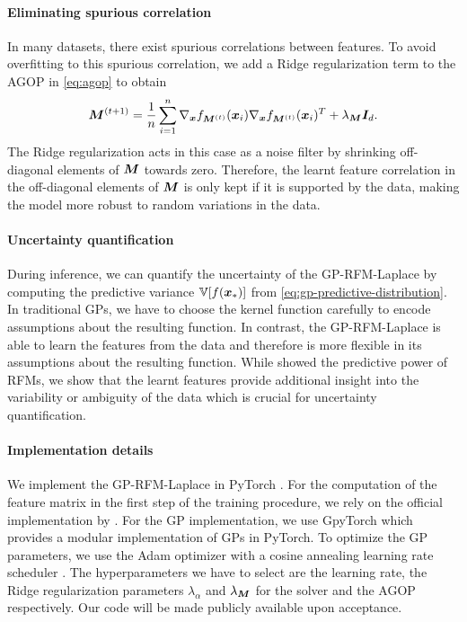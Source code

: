 \paragraph{Eliminating spurious correlation}
In many datasets, there exist spurious correlations between features. To avoid overfitting to this spurious correlation, we add a Ridge regularization term to the AGOP in \cref{eq:agop} to obtain
\begin{align}
    {\bm{M}}^{(t+1)} = \frac{1}{n}\sum_{i=1}^n \nabla_{{\bm{x}}}f_{{\bm{M}}^{(t)}}({\bm{x}}_i)\nabla_{{\bm{x}}}f_{{\bm{M}}^{(t)}}({\bm{x}}_i)^T + \lambda_{\bm{M}}{\bm{I}}_d.
    \label{eq:agop-ridge}
\end{align}
The Ridge regularization acts in this case as a noise filter by shrinking off-diagonal elements of ${\bm{M}}$ towards zero.
Therefore, the learnt feature correlation in the off-diagonal elements of ${\bm{M}}$ is only kept if it is supported by the data, making the model more robust to random variations in the data.

\paragraph{Uncertainty quantification}
During inference, we can quantify the uncertainty of the GP-RFM-Laplace by computing the predictive variance $\mathbb{V}[f({\bm{x}}_\ast)]$ from \cref{eq:gp-predictive-distribution}.
In traditional GPs, we have to choose the kernel function carefully to encode assumptions about the resulting function.
In contrast, the GP-RFM-Laplace is able to learn the features from the data and therefore is more flexible in its assumptions about the resulting function.
While \citet{radhakrishnan2022feature} showed the predictive power of RFMs, we show that the learnt features provide additional insight into the variability or ambiguity of the data which is crucial for uncertainty quantification.

\paragraph{Implementation details}
We implement the GP-RFM-Laplace in PyTorch \citep{paszke2019pytorch}. For the computation of the feature matrix in the first step of the training procedure, we rely on the official implementation by \citet{radhakrishnan2022feature}.
For the GP implementation, we use GpyTorch \citep{gardner2018gpytorch} which provides a modular implementation of GPs in PyTorch. To optimize the GP parameters, we use the Adam optimizer \citep{kingma2014adam} with a cosine annealing learning rate scheduler \citep{loshchilov2016sgdr}.
The hyperparameters we have to select are the learning rate, the Ridge regularization parameters $\lambda_\alpha$ and $\lambda_{\bm{M}}$ for the solver and the AGOP respectively.
Our code will be made publicly available upon acceptance.